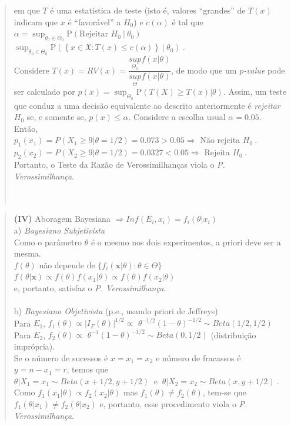 \documentclass[
]{book}
\begin{document}
\begin{quote}
em que \(T\) é uma estatística de teste (isto é, valores ``grandes'' de \(T(x)\) indicam que \(x\) é ``favorável'' a \(H_0\)) e \(c(\alpha)\) é tal que \(\alpha=\displaystyle\sup_{\theta_0\in\Theta_0}\text{P}(\text{Rejeitar } H_0~|~\theta_0)\) \(\displaystyle\sup_{\theta_0\in\Theta_0}\text{P}\left(\left\{x\in\mathfrak{X} : T(x)\leq c(\alpha)\right\}~|~\theta_0\right)~.\)\\
Considere \(T(x)=RV(x)=\dfrac{\underset{\Theta_0}{sup}f(x|\theta)}{\underset{\Theta}{sup}f(x|\theta)}\), de modo que um \(p\)\emph{-value} pode ser calculado por \(p(x)=\displaystyle\sup_{\Theta_0} \text{P}\left(T(X)\geq T(x)|\theta\right)\). Assim, um teste que conduz a uma decisão equivalente ao descrito anteriormente é \emph{rejeitar} \(H_0\) se, e somente se, \(p(x)\leq \alpha\). Considere a escolha usual \(\alpha=0.05\). Então,\\
\(p_1(x_1)=P(X_1\geq 9|\theta=1/2)=0.073>0.05\Rightarrow\) Não rejeita \(H_0~.\)\\
\(p_2(x_2)=P(X_2\geq 9|\theta=1/2)=0.0327<0.05\Rightarrow\) Rejeita \(H_0~.\)\\
Portanto, o Teste da Razão de Verossimilhanças viola o \emph{P. Verossimilhança}.\\
\(~\)\\
\(~\)
\end{quote}

\begin{quote}
\textbf{(IV)} Aboragem Bayesiana \(\Rightarrow Inf(E_i,x_i)=f_i(\theta|x_i)\)\\
a) \emph{Bayesiano Subjetivista}\\
Como o parâmetro \(\theta\) é o mesmo nos dois experimentos, a priori deve ser a mesma.\\
\(f(\theta)\) não depende de \(\{f_i(\boldsymbol x|\theta):\theta\in\Theta\}\)\\
\(f(\theta|\boldsymbol x)\propto f(\theta)f(x_1|\theta)\propto f(\theta)f(x_2|\theta)\)\\
e, portanto, satisfaz o \emph{P. Verossimilhança}.\\
\(~\)\\
b) \emph{Bayesiano Objetivista} (p.e., usando priori de Jeffreys)\\
Para \(E_1\), \(f_1(\theta)\propto |I_F(\theta)|^{1/2}\propto\) \(\theta^{-1/2}(1-\theta)^{-1/2}\sim Beta (1/2,1/2)\)\\
Para \(E_2\), \(f_2(\theta)\propto\) \(\theta^{-1}(1-\theta)^{-1/2}\sim Beta (0,1/2)\) (distribuição imprópria).\\
Se o número de sucessos é \(x=x_1=x_2\) e número de fracassos é \(y=n-x_1=r\), temos que\\
\(\theta|X_1=x_1\sim Beta(x+1/2,y+1/2)~\) e \(~\theta|X_2=x_2\sim Beta(x,y+1/2)~.\)\\
Como \(f_1(x_1|\theta)\propto f_2(x_2|\theta)\) mas \(f_1(\theta)\neq f_2(\theta)\), tem-se que \(f_1(\theta|x_1)\neq f_2(\theta|x_2)\) e, portanto, esse procedimento viola o \emph{P. Verossimilhança}.
\end{quote}
\end{document}

